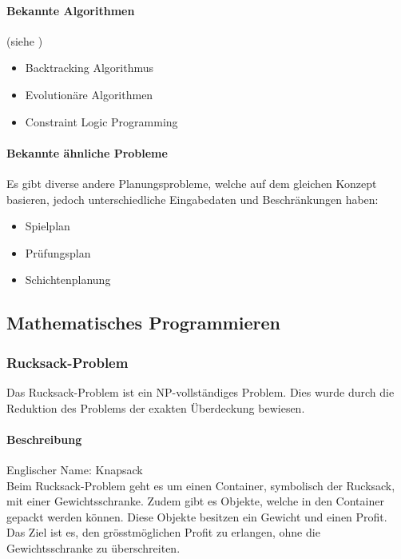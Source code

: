 	\paragraph{Bekannte Algorithmen}
	(siehe \cite{framework_timetabling})
	\begin{itemize}
		\item Backtracking Algorithmus
		\item Evolutionäre Algorithmen
		\item Constraint Logic Programming
	\end{itemize}	

	\paragraph{Bekannte ähnliche Probleme}	
	Es gibt diverse andere Planungsprobleme, welche auf dem gleichen Konzept basieren, jedoch unterschiedliche Eingabedaten und Beschränkungen haben:
	\begin{itemize}
		\item Spielplan
		\item Prüfungsplan
		\item Schichtenplanung
	\end{itemize}

\subsection{Mathematisches Programmieren}\label{mathematical_programming}

	\subsubsection{Rucksack-Problem}\label{knapsack}
	Das Rucksack-Problem ist ein NP-vollständiges Problem. Dies wurde durch die Reduktion des Problems der exakten Überdeckung bewiesen.

	\paragraph{Beschreibung}
	Englischer Name: Knapsack\\
	Beim Rucksack-Problem geht es um einen Container, symbolisch der Rucksack, mit einer Gewichtsschranke. Zudem gibt es Objekte, welche in den Container gepackt werden 
	können. Diese Objekte besitzen ein Gewicht und einen Profit. Das Ziel ist es, den grösstmöglichen Profit zu erlangen, ohne die Gewichtsschranke zu überschreiten. 
	\cite{knapsack_desc_web}

